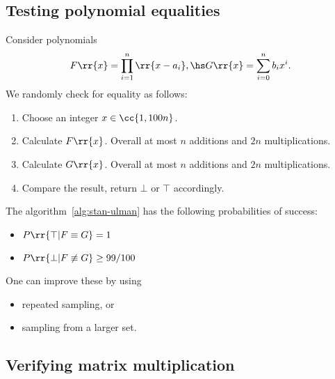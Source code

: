 \documentclass{article}
\begin{document}
\subsection{Testing polynomial equalities}

\begin{algorithm}\label{alg:stan-ulman}
  Consider polynomials
  \begin{align*}
    F \rr{ x } = \prod_{i=1}^n \rr{ x - a_i }, \hs G \rr{ x } = \sum_{ i=0 }^{ n } b_i x^i.
  \end{align*}
  We randomly check for equality as follows:
  \begin{enumerate}
    \item Choose an integer $x\in \cc{ 1, 100n }$.
    \item Calculate $F \rr{ x }$. Overall at most $n$ additions and $2n$ multiplications.
    \item Calculate $G \rr{ x }$. Overall at most $n$ additions and $2n$ multiplications.
    \item Compare the result, return $\bot$ or $\top$ accordingly.
  \end{enumerate}
\end{algorithm}


\begin{theorem}
  \label{thm:stan-ulman-probabilities}
  The algorithm~\ref{alg:stan-ulman} has the following probabilities of success:
  \begin{itemize}
    \item $P \rr{ \top | F\equiv G } = 1$
    \item $P \rr{ \bot | F\not\equiv G } \geq 99/100$
  \end{itemize}
  One can improve these by using
  \begin{itemize}
    \item repeated sampling, or
    \item sampling from a larger set.
  \end{itemize}
\end{theorem}

\subsection{Verifying matrix multiplication}
\end{document}
